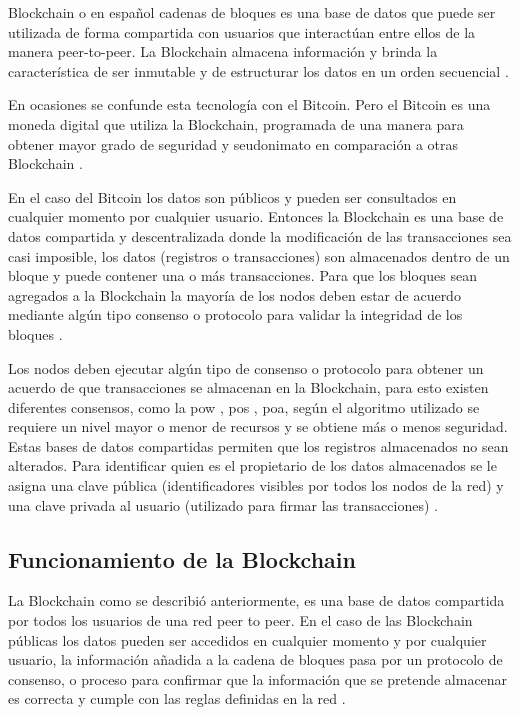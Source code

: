  Blockchain  o en español cadenas de bloques es una base de datos que puede ser utilizada de forma compartida 
con  usuarios que interactúan entre ellos de la manera peer-to-peer. La  Blockchain   almacena información y 
brinda la característica de ser inmutable y de estructurar  los datos en un orden secuencial \cite[]{retamal_Blockchain_2017}.

En ocasiones se confunde esta tecnología con el Bitcoin. Pero el Bitcoin es una moneda digital que utiliza la   Blockchain,
programada de una manera para obtener mayor grado de  seguridad y seudonimato en comparación a otras  Blockchain \cite[]{choo_Blockchain_2020}.


En el caso del Bitcoin los datos son públicos y pueden ser consultados en cualquier momento por cualquier 
usuario. 
Entonces la  Blockchain  es una base de datos compartida y descentralizada donde la modificación de las 
transacciones sea casi imposible, los datos (registros o transacciones) son 
almacenados dentro de un bloque y puede contener una o más transacciones. Para que los bloques sean agregados a la   Blockchain  
la mayoría de los nodos deben estar de acuerdo mediante algún tipo consenso o protocolo para validar la integridad de los bloques \cite[]{retamal_Blockchain_2017,choo_Blockchain_2020}.

Los nodos deben ejecutar algún tipo de consenso o protocolo para obtener un acuerdo  de que transacciones se 
almacenan en la  Blockchain,  para esto existen diferentes consensos, como la \gls{pow} \cite[]{retamal_Blockchain_2017}, \gls{pos} \cite[]{drescher_Blockchain_2017}, 
 \gls{poa}, según    el  algoritmo utilizado se requiere un nivel mayor o menor de  recursos y se obtiene 
más o menos seguridad. 
Estas bases de datos compartidas permiten que los registros almacenados no sean alterados. Para identificar 
quien es el propietario de los datos almacenados se le asigna una clave pública (identificadores visibles por
todos los nodos de la red) y una clave privada al usuario (utilizado para firmar las transacciones) \cite[]{retamal_Blockchain_2017}. 


\subsection{Funcionamiento de la Blockchain}
 La  Blockchain como se describió anteriormente, es una base de datos compartida
 por todos los usuarios de una red peer to peer. En  el caso de las  Blockchain públicas los datos
 pueden ser accedidos en cualquier momento y por cualquier usuario, la información añadida a la cadena de bloques pasa por un protocolo de consenso,
 o proceso para confirmar que la información que se pretende almacenar es correcta y cumple
 con las reglas definidas en la red \cite[]{retamal_Blockchain_2017,dannen_introducing_2017}.

